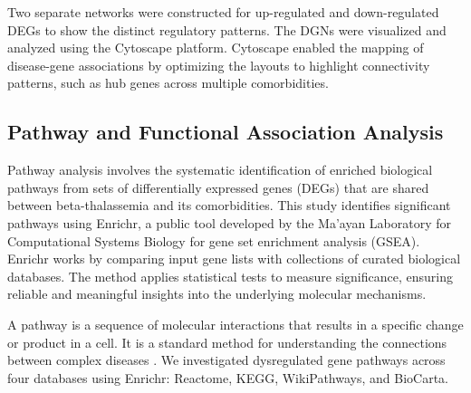 Two separate networks were constructed for up-regulated and down-regulated DEGs to show the distinct regulatory patterns. The DGNs were visualized and analyzed using the Cytoscape platform. Cytoscape enabled the mapping of disease-gene associations by optimizing the layouts to highlight connectivity patterns, such as hub genes across multiple comorbidities.

\vspace*{-\parskip} %
\subsection{Pathway and Functional Association Analysis}
\label{sec:sec:sec3_4_4}

Pathway analysis involves the systematic identification of enriched biological pathways from sets of differentially expressed genes (DEGs) that are shared between beta-thalassemia and its comorbidities. This study identifies significant pathways using Enrichr, a public tool developed by the Ma'ayan Laboratory for Computational Systems Biology for gene set enrichment analysis (GSEA). Enrichr works by comparing input gene lists with collections of curated biological databases. The method applies statistical tests to measure significance, ensuring reliable and meaningful insights into the underlying molecular mechanisms.

A pathway is a sequence of molecular interactions that results in a specific change or product in a cell. It is a standard method for understanding the connections between complex diseases \cite{b14}. We investigated dysregulated gene pathways across four databases using Enrichr: Reactome, KEGG, WikiPathways, and BioCarta.


